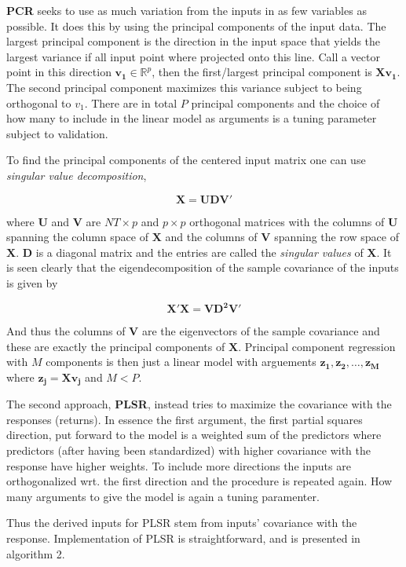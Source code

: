 \documentclass[11pt]{article}
\begin{document}
\textbf{PCR} seeks to use as much variation from the inputs in as few
variables as possible. It does this by using the principal components of
the input data. The largest principal component is the direction in the
input space that yields the largest variance if all input point where
projected onto this line. Call a vector point in this direction
\(\bm{v_1} \in \mathbb{R}^p\), then the first/largest principal component is
\(\bm{X v_1}\). The second principal component maximizes this variance
subject to being orthogonal to \(v_1\). There are in total \(P\)
principal components and the choice of how many to include in the linear
model as arguments is a tuning parameter subject to validation.

To find the principal components of the centered input matrix one can use \emph{singular value decomposition},

\[
\bm{X = UDV'}  
\]

where \(\bm{U}\) and \(\bm{V}\) are \( NT \times p \) and \( p \times p \) orthogonal matrices with the columns of \(\bm{U}\) spanning the column space of \(\bm{X}\) and the columns of \(\bm{V}\) spanning the row space of \(\bm{X}\). \(\bm{D}\) is a diagonal matrix and the entries are called the \emph{singular values} of \(\bm{X}\). It is seen clearly that the eigendecomposition of the sample covariance of the inputs is given by

\[
  \bm{X'X = VD^2V'}
\]

And thus the columns of \(\bm{V}\) are the eigenvectors of the sample covariance and these are exactly the principal components of \(\bm{X}\). Principal component regression with \(M\) components is then just a linear model with arguements \(\bm{z_1, z_2}, \dots, \bm{z_M}\) where \(\bm{z_j} = \bm{Xv_j}\) and \(M<P\).

The second approach, \textbf{PLSR}, instead tries to maximize the
covariance with the responses (returns). In essence the first argument,
the first partial squares direction, put forward to the model is a
weighted sum of the predictors where predictors (after having been
standardized) with higher covariance with the response have higher
weights. To include more directions the inputs are orthogonalized wrt. the first direction and the procedure is repeated again. How many arguments to give the model is again a tuning paramenter.

Thus the derived inputs for PLSR stem from inputs' covariance with the response. Implementation of PLSR is straightforward, and is presented in algorithm 2.
\end{document}
